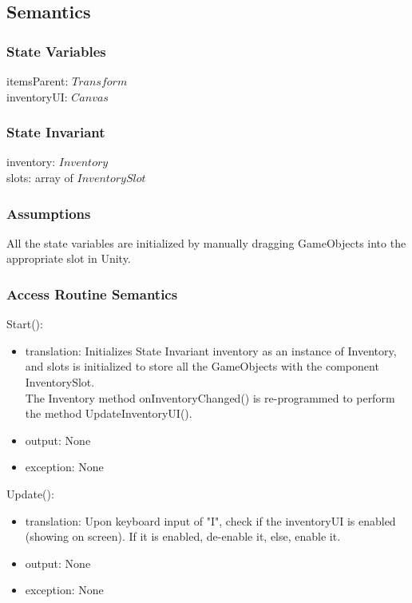 \documentclass[12pt]{article}
\begin{document}
\subsection* {Semantics}

\subsubsection* {State Variables}

itemsParent: $Transform$\\
inventoryUI: $Canvas$\\

\subsubsection* {State Invariant}

inventory: $Inventory$\\
slots: array of $InventorySlot$

\subsubsection* {Assumptions}

All the state variables are initialized by manually dragging GameObjects into the appropriate slot in Unity.

\subsubsection* {Access Routine Semantics}

\noindent Start():
\begin{itemize}
\item translation: Initializes State Invariant inventory as an instance of Inventory, and slots is initialized to store all the GameObjects with the component InventorySlot.\\
The Inventory method onInventoryChanged() is re-programmed to perform the method UpdateInventoryUI().
\item output: None
\item exception: None
\end{itemize}

\noindent Update():
\begin{itemize}
\item translation: Upon keyboard input of "I", check if the inventoryUI is enabled (showing on screen). If it is enabled, de-enable it, else, enable it.
\item output: None
\item exception: None
\end{itemize}
\end{document}
